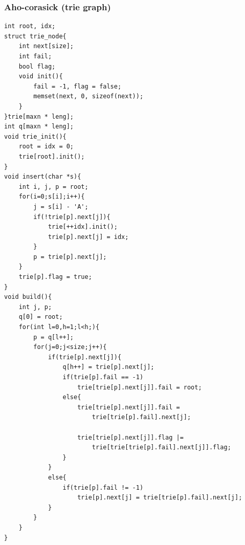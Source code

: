 \documentclass[a4paper]{article}
\begin{document}
\begin{CJK*}{UTF8}{gbsn}
\begin{multicols}{3}
\begin{flushleft}
\subsubsection{Aho-corasick (trie graph)}
\begin{lstlisting}
int root, idx;
struct trie_node{
    int next[size];
    int fail;
    bool flag;
    void init(){
        fail = -1, flag = false;
        memset(next, 0, sizeof(next));
    }
}trie[maxn * leng];
int q[maxn * leng];
void trie_init(){
    root = idx = 0;
    trie[root].init();
}
void insert(char *s){
    int i, j, p = root;
    for(i=0;s[i];i++){
        j = s[i] - 'A';
        if(!trie[p].next[j]){
            trie[++idx].init();
            trie[p].next[j] = idx;
        }
        p = trie[p].next[j];
    }
    trie[p].flag = true;
}
void build(){
    int j, p;
    q[0] = root;
    for(int l=0,h=1;l<h;){
        p = q[l++];
        for(j=0;j<size;j++){
            if(trie[p].next[j]){
                q[h++] = trie[p].next[j];
                if(trie[p].fail == -1)
                    trie[trie[p].next[j]].fail = root;
                else{
                    trie[trie[p].next[j]].fail =
                        trie[trie[p].fail].next[j];

                    trie[trie[p].next[j]].flag |=
                        trie[trie[trie[p].fail].next[j]].flag;
                }
            }
            else{
                if(trie[p].fail != -1)
                    trie[p].next[j] = trie[trie[p].fail].next[j];
            }
        }
    }
}
\end{lstlisting}
\begin{lstlisting}
\end{lstlisting}
\begin{lstlisting}
\end{lstlisting}


\end{flushleft}
\end{multicols}
\end{CJK*}
\end{document}
